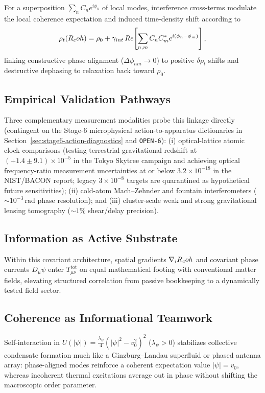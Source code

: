 For a superposition $\sum_n C_n e^{i\phi_n}$ of local modes, interference cross-terms modulate the local coherence expectation and induced time-density shift according to
\begin{equation}
\rho_t(R_coh) = \rho_0 + \gamma_{int}\,Re\!\left[\sum_{n,m} C_n C_m^* e^{i(\phi_n - \phi_m)}\right],
\end{equation}
linking constructive phase alignment ($\Delta\phi_{nm} \to 0$) to positive $\delta\rho_t$ shifts and destructive dephasing to relaxation back toward $\rho_0$.

\subsection{Empirical Validation Pathways}

Three complementary measurement modalities probe this linkage directly (contingent on the Stage-6 microphysical action-to-apparatus dictionaries in Section~\ref{sec:stage6-action-diagnostics} and \texttt{OPEN-6}): (i) optical-lattice atomic clock comparisons (testing terrestrial gravitational redshift at $(+1.4 \pm 9.1)\times 10^{-5}$ in the Tokyo Skytree campaign and achieving optical frequency-ratio measurement uncertainties at or below $3.2\times 10^{-18}$ in the NIST/BACON report; legacy $3\times 10^{-8}$ targets are quarantined as hypothetical future sensitivities); (ii) cold-atom Mach--Zehnder and fountain interferometers ($\sim 10^{-3}\,\mathrm{rad}$ phase resolution); and (iii) cluster-scale weak and strong gravitational lensing tomography ($\sim 1\%$ shear/delay precision).

\subsection{Information as Active Substrate}

Within this covariant architecture, spatial gradients $\nabla_iR_coh$ and covariant phase currents $D_\mu\psi$ enter $T_{\mu\nu}^{\mathrm{tot}}$ on equal mathematical footing with conventional matter fields, elevating structured correlation from passive bookkeeping to a dynamically tested field sector.

\subsection{Coherence as Informational Teamwork}

Self-interaction in $U(|\psi|) = \frac{\lambda_\psi}{4}(|\psi|^2 - v_0^2)^2$ ($\lambda_\psi > 0$) stabilizes collective condensate formation much like a Ginzburg--Landau superfluid or phased antenna array: phase-aligned modes reinforce a coherent expectation value $|\psi| = v_0$, whereas incoherent thermal excitations average out in phase without shifting the macroscopic order parameter.

